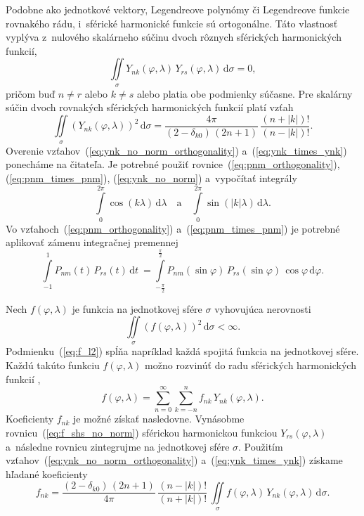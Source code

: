 \documentclass[a4paper, 12pt]{book}
\newcommand{\diff}{\mathrm d}
\begin{document}
Podobne ako jednotkové vektory, Legendreove polynómy či Legendreove funkcie 
rovnakého rádu, i~sférické harmonické funkcie sú ortogonálne.  Táto vlastnosť 
vyplýva z~nulového skalárneho súčinu dvoch rôznych sférických harmonických 
funkcií,
%
\begin{equation}
\label{eq:ynk_no_norm_orthogonality}
\iint\limits_{\sigma} Y_{nk}(\varphi, \lambda) \, Y_{rs}(\varphi, \lambda) \, 
\diff \sigma = 0{,}
\end{equation}
%
pričom buď $n \neq r$ alebo $k \neq s$ alebo platia obe podmienky súčasne.  Pre
skalárny súčin dvoch rovnakých sférických harmonických funkcií platí vzťah
%
\begin{equation}
\label{eq:ynk_times_ynk}
\iint\limits_{\sigma} \left( Y_{nk}(\varphi, \lambda) \right)^2 \, \diff \sigma 
=
%
\dfrac{4\pi}{(2 - \delta_{k0}) \, (2n + 1)} \, \dfrac{(n + |k|)!}{(n
- |k|)!}{.}
\end{equation}
%
Overenie vzťahov~(\ref{eq:ynk_no_norm_orthogonality})
a~(\ref{eq:ynk_times_ynk}) ponecháme na čitateľa.  Je potrebné použiť
rovnice~(\ref{eq:pnm_orthogonality}), (\ref{eq:pnm_times_pnm}),
(\ref{eq:ynk_no_norm}) a~vypočítať integrály
%
\begin{equation}
\int\limits_{0}^{2\pi} \cos(k \lambda) \, \diff\lambda \quad \text{a} \quad
\int\limits_{0}^{2\pi} \sin(|k| \lambda) \, \diff\lambda{.}
\end{equation}
%
Vo vzťahoch~(\ref{eq:pnm_orthogonality}) a~(\ref{eq:pnm_times_pnm}) je potrebné
aplikovať zámenu integračnej premennej
%
\begin{equation}
\int\limits_{-1}^{1} P_{nm}(t) \, P_{rs}(t) \, \diff
t~= \int\limits_{-\frac{\pi}{2}}^{\frac{\pi}{2}} P_{nm}(\sin\varphi) \,
P_{rs}(\sin\varphi) \, \cos\varphi \, \diff \varphi{.}
\end{equation}


Nech $f(\varphi, \lambda)$ je funkcia na jednotkovej sfére $\sigma$ vyhovujúca 
nerovnosti
%
\begin{equation}
\label{eq:f_l2}
\iint\limits_\sigma \left( f(\varphi, \lambda) \right)^2 \, \diff \sigma 
< \infty{.}
\end{equation}
%
Podmienku~(\ref{eq:f_l2}) spĺňa napríklad každá spojitá funkcia na jednotkovej
sfére.  Každú takúto funkciu $f(\varphi, \lambda)$ možno rozvinúť do radu
sférických harmonických funkcií \parencite[napríklad][]{MoritzPhysicalGeodesy},
%
\begin{equation}
\label{eq:f_shs_no_norm}
f(\varphi, \lambda) = \sum_{n = 0}^\infty \sum_{k = -n}^n f_{nk} \,
Y_{nk}(\varphi, \lambda){.}
\end{equation}
%
Koeficienty $f_{nk}$ je možné získať nasledovne.  Vynásobme 
rovnicu~(\ref{eq:f_shs_no_norm}) sférickou harmonickou funkciou 
$Y_{rs}(\varphi, \lambda)$ a~následne rovnicu zintegrujme na jednotkovej sfére 
$\sigma$.  Použitím vzťahov~(\ref{eq:ynk_no_norm_orthogonality}) 
a~(\ref{eq:ynk_times_ynk}) získame hľadané koeficienty
%
\begin{equation}
\label{eq:f_sha_no_norm}
f_{nk} = \frac{(2 - \delta_{k0}) \, (2n + 1)}{4\pi} \, \frac{(n - |k|)!}{(n 
+ |k|)!} \, \iint\limits_{\sigma} f(\varphi, \lambda) \, Y_{nk}(\varphi, 
\lambda) \, \diff \sigma{.}
\end{equation}
\end{document}
